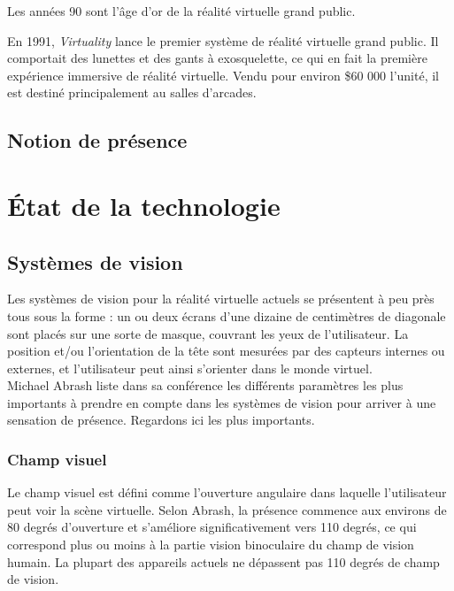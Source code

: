 \documentclass[a4,12pt]{scrartcl}
\begin{document}
Les années 90 sont l'âge d'or de la réalité virtuelle grand public.


En 1991, \emph{Virtuality} lance le premier système de réalité virtuelle grand public. Il comportait des lunettes et des gants à exosquelette, ce qui en fait la première expérience immersive de réalité virtuelle. Vendu pour environ \$60 000 l'unité, il est destiné principalement au salles d'arcades.

\subsection{Notion de présence}

\cite{schuemie2001research}

\section{État de la technologie}


\subsection{Systèmes de vision}

Les systèmes de vision pour la réalité virtuelle actuels se présentent à peu près tous sous la forme : un ou deux écrans d’une dizaine de centimètres de diagonale sont placés sur une sorte de masque, couvrant les yeux de l’utilisateur. La position et/ou l’orientation de la tête sont mesurées par des capteurs internes ou externes, et l’utilisateur peut ainsi s’orienter dans le monde virtuel.\\

Michael Abrash liste dans sa conférence \cite{Abrash14} les différents paramètres les plus importants à prendre en compte dans les systèmes de vision pour arriver à une sensation de présence. Regardons ici les plus importants.

\subsubsection{Champ visuel}

Le champ visuel est défini comme l'ouverture angulaire dans laquelle l'utilisateur peut voir la scène virtuelle. Selon Abrash, la présence commence aux environs de 80 degrés d'ouverture et s'améliore significativement vers 110 degrés, ce qui correspond plus ou moins à la partie vision binoculaire du champ de vision humain. La plupart des appareils actuels ne dépassent pas 110 degrés de champ de vision.
\end{document}
